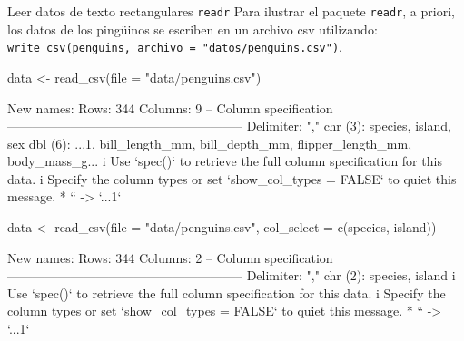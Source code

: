 \documentclass[
  ignorenonframetext,
  aspectratio=169]{beamer}
\newenvironment{Shaded}{\begin{snugshade}}{\end{snugshade}}
\newcommand{\AttributeTok}[1]{\textcolor[rgb]{0.77,0.63,0.00}{#1}}
\newcommand{\FunctionTok}[1]{\textcolor[rgb]{0.00,0.00,0.00}{#1}}
\newcommand{\NormalTok}[1]{#1}
\newcommand{\OtherTok}[1]{\textcolor[rgb]{0.56,0.35,0.01}{#1}}
\newcommand{\StringTok}[1]{\textcolor[rgb]{0.31,0.60,0.02}{#1}}
\let\oldverbatim\verbatim
\let\endoldverbatim\endverbatim
\renewenvironment{verbatim}{\tiny\oldverbatim}{\endoldverbatim}
\begin{document}
\begin{frame}[fragile]{Leer datos de texto rectangulares \texttt{readr}}
\protect\hypertarget{leer-datos-de-texto-rectangulares-readr-2}{}
Para ilustrar el paquete \texttt{readr}, a priori, los datos de los
pingüinos se escriben en un archivo csv utilizando:
\texttt{write\_csv(penguins,\ archivo\ =\ "datos/penguins.csv")}.

\begin{Shaded}
\begin{Highlighting}[]
\NormalTok{data }\OtherTok{\textless{}{-}} \FunctionTok{read\_csv}\NormalTok{(}\AttributeTok{file =} \StringTok{"data/penguins.csv"}\NormalTok{)}
\end{Highlighting}
\end{Shaded}

\begin{verbatim}
New names:
Rows: 344 Columns: 9
-- Column specification
-------------------------------------------------------- Delimiter: "," chr
(3): species, island, sex dbl (6): ...1, bill_length_mm, bill_depth_mm,
flipper_length_mm, body_mass_g...
i Use `spec()` to retrieve the full column specification for this data. i
Specify the column types or set `show_col_types = FALSE` to quiet this message.
* `` -> `...1`
\end{verbatim}

\begin{Shaded}
\begin{Highlighting}[]
\NormalTok{data }\OtherTok{\textless{}{-}} \FunctionTok{read\_csv}\NormalTok{(}\AttributeTok{file =} \StringTok{"data/penguins.csv"}\NormalTok{, }\AttributeTok{col\_select =} \FunctionTok{c}\NormalTok{(species, island))}
\end{Highlighting}
\end{Shaded}

\begin{verbatim}
New names:
Rows: 344 Columns: 2
-- Column specification
-------------------------------------------------------- Delimiter: "," chr
(2): species, island
i Use `spec()` to retrieve the full column specification for this data. i
Specify the column types or set `show_col_types = FALSE` to quiet this message.
* `` -> `...1`
\end{verbatim}
\end{frame}
\end{document}
